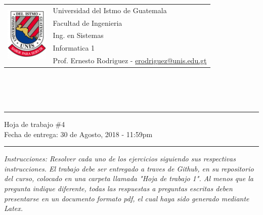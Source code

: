 \documentclass{article}
\newcommand{\horrule}[1]{\rule{\linewidth}{#1}}
\begin{document}
\begin{tabular}{l l}
\multirow{5}{*}{\includegraphics[width=2cm]{data/logo.png}}
 & Universidad del Istmo de Guatemala \\
 & Facultad de Ingenieria \\
 & Ing. en Sistemas \\
 & Informatica 1 \\
 & Prof. Ernesto Rodriguez - \href{mailto:erodriguez@unis.edu.gt}{erodriguez@unis.edu.gt} \\
\end{tabular}
\\\\\\

\begin{center}
        \horrule{0.5pt}
        \huge{Hoja de trabajo \#4} \\
        \large{Fecha de entrega: 30 de Agosto, 2018 - 11:59pm} \\
        \horrule{1pt}
\end{center}

\emph{Instrucciones: Resolver cada uno de los ejercicios siguiendo sus respectivas
instrucciones. El trabajo debe ser entregado a traves de Github, en su repositorio del curso, colocado en una carpeta llamada "Hoja de trabajo 1".
Al menos que la pregunta indique diferente, todas las respuestas a preguntas escritas deben presentarse en
un documento formato pdf, el cual haya sido generado mediante Latex. }
\end{document}
